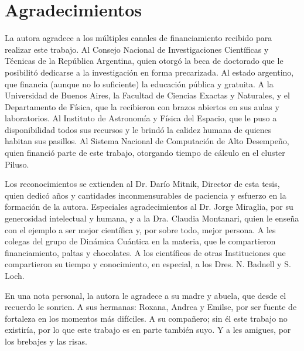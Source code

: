 \chapter*{Agradecimientos}%
%

La autora agradece a los múltiples canales de financiamiento recibido 
para realizar este trabajo. Al Consejo Nacional de 
Investigaciones Científicas y Técnicas de la República Argentina, quien 
otorgó la beca de doctorado que le posibilitó dedicarse a la 
investigación en forma precarizada. Al estado argentino, que financia 
(aunque no 
lo suficiente) la educación pública y gratuita. A la Universidad de 
Buenos Aires, la Facultad de Ciencias Exactas y Naturales, y el 
Departamento de Física, que la recibieron con brazos abiertos en sus 
aulas y laboratorios. Al Instituto de Astronomía y Física del Espacio, 
que le puso a disponibilidad todos sus recursos y le brindó la calidez 
humana de quienes habitan sus pasillos. 
Al Sistema Nacional de Computación de Alto Desempeño, quien 
financió parte de este trabajo, otorgando tiempo de cálculo en el cluster 
Piluso. 

Los reconocimientos se extienden al Dr. Darío Mitnik, Director de esta 
tesis, quien dedicó años y cantidades inconmensurables de paciencia y 
esfuerzo en la formación de la autora. Especiales agradecimientos al 
Dr. Jorge Miraglia, por su generosidad intelectual y humana, y a la Dra. 
Claudia Montanari, quien le enseña con el ejemplo a ser mejor científica 
y, por sobre todo, mejor persona. A les colegas del grupo de Dinámica 
Cuántica en la materia, que le compartieron financiamiento, paltas y 
chocolates. A los científicos de otras Instituciones que compartieron su 
tiempo y conocimiento, en especial, a los Dres. N. Badnell y S. Loch.

En una nota personal, la autora le agradece a su madre y abuela, que 
desde el recuerdo le sonrien. A sus hermanas: Roxana, Andrea y Emilse, 
por ser fuente de fortaleza en los momentos más difíciles. A su 
compañero; sin él este trabajo no existiría, por lo que este trabajo es 
en parte también suyo. Y a les amigues, por los brebajes y las risas.

